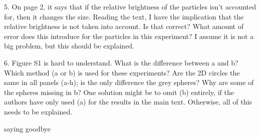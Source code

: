 \documentclass[10pt,a4paper]{letter}
\begin{document}
\begin{letter}{}
5. On page 2, it says that if the relative brightness of the particles isn't accounted for, then it changes the size. Reading the text, I have the implication that the relative brightness is not taken into account. Is that correct? What amount of error does this introduce for the particles in this experiment? I assume it is not a big problem, but this should be explained.

6. Figure S1 is hard to understand. What is the difference between a and b? Which method (a or b) is used for these experiments? Are the 2D circles the same in all panels (a-h); is the only difference the grey spheres? Why are some of the spheres missing in b? One solution might be to omit (b) entirely, if the authors have only used (a) for the results in the main text. Otherwise, all of this needs to be explained. 
 
\closing{saying goodbye} 
\end{letter} 
\end{document}
